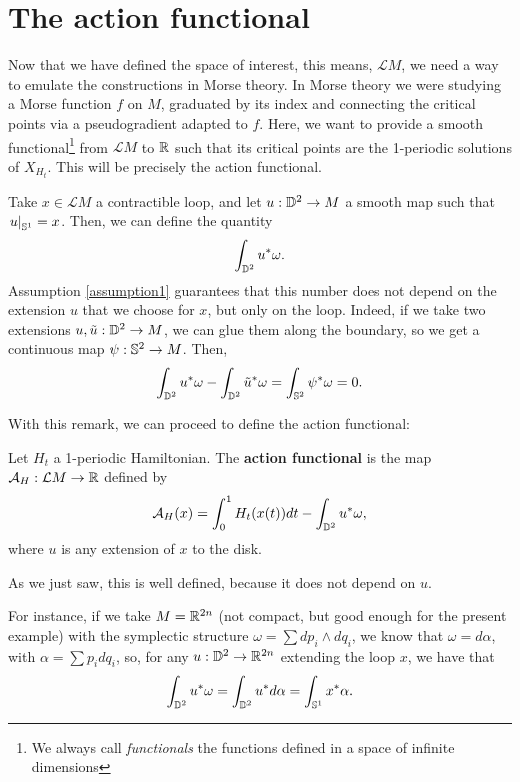 \section{The action functional}

Now that we have defined the space of interest, this means, $\mathcal{L}M$, we need a way to emulate the constructions in Morse theory. In Morse theory we were studying a Morse function $f$ on $M$, graduated by its index and connecting the critical points via a pseudogradient adapted to $f$. Here, we want to provide a smooth functional\footnote{We always call {\it functionals} the functions defined in a space of infinite dimensions} from $\mathcal{L}M$ to $\mathbb{R}$ such that its critical points are the 1-periodic solutions of $X_{H_t}$. This will be precisely the action functional.

\begin{rmrk}
Take $x \in \mathcal{L}M$ a contractible loop, and let $u : \mathbb{D}^2 \rightarrow M$ a smooth map such that $\left. u \right|_{\mathbb{S}^1} = x$. Then, we can define the quantity
\[\int_{\mathbb{D}^2} u^{\ast}\omega .\]
Assumption \ref{assumption1} guarantees that this number does not depend on the extension $u$ that we choose for $x$, but only on the loop. Indeed, if we take two extensions $u, \tilde{u} : \mathbb{D}^2 \rightarrow M$, we can glue them along the boundary, so we get a continuous map $\psi : \mathbb{S}^2 \rightarrow M$. Then,
\[\int_{\mathbb{D}^2} u^{\ast} \omega - \int_{\mathbb{D}^2} \tilde{u}^{\ast} \omega = \int_{\mathbb{S}^2} \psi^{\ast} \omega = 0 .\]
\end{rmrk}

With this remark, we can proceed to define the action functional:

\begin{deff}
Let $H_t$ a 1-periodic Hamiltonian. The {\bf action functional} is the map $\mathcal{A}_H : \mathcal{L}M \rightarrow \mathbb{R}$ defined by
\[\mathcal{A}_H(x) = \int_0^1 H_t(x(t)) d t - \int_{\mathbb{D}^2} u^{\ast} \omega ,\]
where $u$ is any extension of $x$ to the disk.
\end{deff}

As we just saw, this is well defined, because it does not depend on $u$.

For instance, if we take $M = \mathbb{R}^{2n}$ (not compact, but good enough for the present example) with the symplectic structure $\omega = \sum d p_i \wedge d q_i$, we know that $\omega = d \alpha$, with $\alpha = \sum p_i d q_i$, so, for any $u : \mathbb{D}^2 \rightarrow \mathbb{R}^{2n}$ extending the loop $x$, we have that
\[\int_{\mathbb{D}^2} u^{\ast} \omega = \int_{\mathbb{D}^2}  u^{\ast} d \alpha = \int_{\mathbb{S}^1} x^{\ast} \alpha .\]

